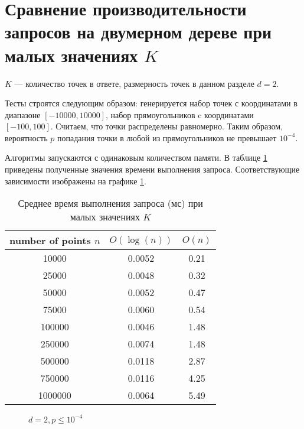 \documentclass[12pt,a4paper]{article}
\begin{document}
\section*{Сравнение производительности запросов на двумерном дереве при малых значениях $K$}

$K$ --- количество точек в ответе, размерность точек в данном разделе $d = 2$.

Тесты строятся следующим образом: генерируется набор точек с координатами в диапазоне $[-10000, 10000]$, набор прямоугольников c координатами $[-100, 100]$. Считаем, что точки распределены равномерно. Таким образом, вероятность $p$ попадания точки в любой из прямоугольников не превышает $10^{-4}$.

Алгоритмы запускаются с одинаковым количеством памяти. В таблице \ref{table:durationsk} приведены полученные значения времени выполнения запроса. Соответствующие зависимости изображены на графике \ref{pic:durationsk}.

\begin{table}[h]
	\begin{tabular}{c || c | c }
		number of points $n$ & $O(\log(n))$ & $O(n)$ \\
		\hline
		10000 & 0.0052 & 0.21 \\
		25000 & 0.0048 & 0.32 \\
		50000 & 0.0052 & 0.47 \\
		75000 & 0.0060 & 0.54 \\
		100000 & 0.0046 & 1.48 \\
		250000 & 0.0074 & 1.48 \\
		500000 & 0.0118 & 2.87 \\
		750000 & 0.0116 & 4.25 \\
		1000000 & 0.0064 & 5.49 \\
	\end{tabular}

	\caption{Среднее время выполнения запроса (мс) при малых значениях $K$}
	\label{table:durationsk}
\end{table}

\begin{figure}[H]

	\caption{$d=2, p \le 10^{-4}$}
	\label{pic:durationsk}
\end{figure}
\end{document}
